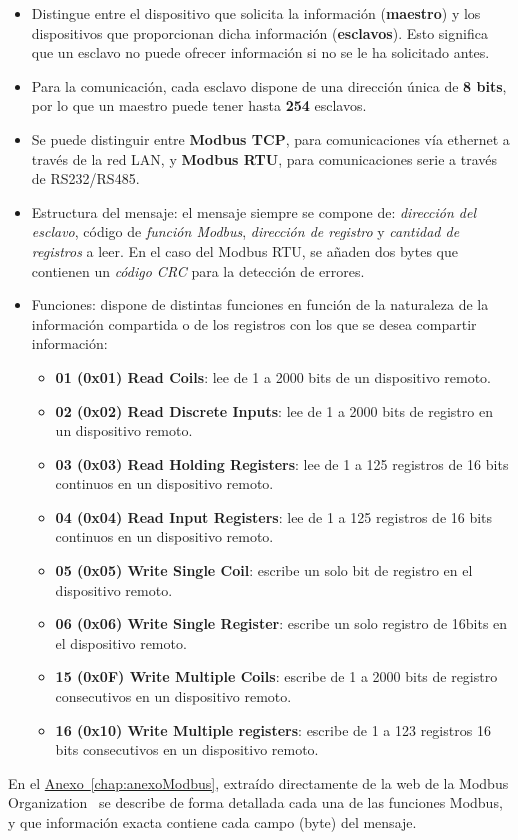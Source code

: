\begin{itemize}
  \item Distingue entre el dispositivo que solicita la información (\textbf{maestro}) y los dispositivos que proporcionan dicha información (\textbf{esclavos}). Esto significa que un esclavo no puede ofrecer información si no se le ha solicitado antes.  
  \item Para la comunicación, cada esclavo dispone de una dirección única de \textbf{8 bits}, por lo que un maestro puede tener hasta \textbf{254} esclavos.
  \item Se puede distinguir entre \textbf{Modbus TCP}, para comunicaciones vía ethernet a través de la red LAN, y \textbf{Modbus RTU}, para comunicaciones serie a través de RS232/RS485.
  \item Estructura del mensaje: el mensaje siempre se compone de: \textit{dirección del esclavo}, código de \textit{función Modbus}, \textit{dirección de registro} y \textit{cantidad de registros} a leer. En el caso del Modbus RTU, se añaden dos bytes que contienen un \textit{código CRC} para la detección de errores.
  \item Funciones: dispone de distintas funciones en función de la naturaleza de la información compartida o de los registros con los que se desea compartir información:
  \begin{itemize}
    \item \textbf{01 (0x01) Read Coils}: lee de 1 a 2000 bits de un dispositivo remoto.
    \item \textbf{02 (0x02) Read Discrete Inputs}: lee de 1 a 2000 bits de registro en un dispositivo remoto.
    \item \textbf{03 (0x03) Read Holding Registers}: lee de 1 a 125 registros de 16 bits continuos en un dispositivo remoto.
    \item \textbf{04 (0x04) Read Input Registers}: lee de 1 a 125 registros de 16 bits continuos en un dispositivo remoto.
    \item \textbf{05 (0x05) Write Single Coil}: escribe un solo bit de registro en el dispositivo remoto.
    \item \textbf{06 (0x06) Write Single Register}: escribe un solo registro de 16bits en el dispositivo remoto.
    \item \textbf{15 (0x0F) Write Multiple Coils}: escribe de 1 a 2000 bits de registro consecutivos en un dispositivo remoto.
    \item \textbf{16 (0x10) Write Multiple registers}: escribe de 1 a 123 registros 16 bits consecutivos en un dispositivo remoto.
  \end{itemize}  
\end{itemize} 

En el \hyperref[chap:anexoModbus]{Anexo~\ref{chap:anexoModbus}}, extraído directamente de la web de la Modbus Organization~\cite{modbusorg} se describe de forma detallada cada una de las funciones Modbus, y que información exacta contiene cada campo (byte) del mensaje.


